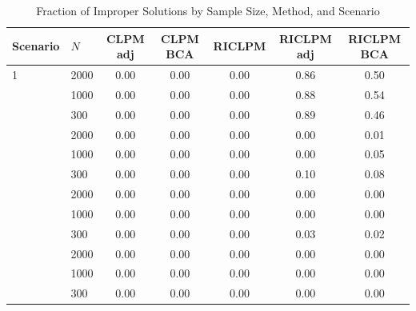 \begin{table}[htbp]
\centering
\caption{Fraction of Improper Solutions by Sample Size, Method, and Scenario}
\label{tab:improper-all-scenarios}
\begin{tabular}{llccccc}
\toprule
Scenario & $N$ & CLPM adj & CLPM BCA & RICLPM & RICLPM adj & RICLPM BCA\\
\midrule
1 & 2000 & 0.00 & 0.00 & 0.00 & 0.86 & 0.50\\
  & 1000 & 0.00 & 0.00 & 0.00 & 0.88 & 0.54\\
  & 300 & 0.00 & 0.00 & 0.00 & 0.89 & 0.46\\
\addlinespace
2 & 2000 & 0.00 & 0.00 & 0.00 & 0.00 & 0.01\\
  & 1000 & 0.00 & 0.00 & 0.00 & 0.00 & 0.05\\
  & 300 & 0.00 & 0.00 & 0.00 & 0.10 & 0.08\\
\addlinespace
3 & 2000 & 0.00 & 0.00 & 0.00 & 0.00 & 0.00\\
  & 1000 & 0.00 & 0.00 & 0.00 & 0.00 & 0.00\\
  & 300 & 0.00 & 0.00 & 0.00 & 0.03 & 0.02\\
\addlinespace
4 & 2000 & 0.00 & 0.00 & 0.00 & 0.00 & 0.00\\
  & 1000 & 0.00 & 0.00 & 0.00 & 0.00 & 0.00\\
  & 300 & 0.00 & 0.00 & 0.00 & 0.00 & 0.00\\
\bottomrule
\end{tabular}
\end{table}
